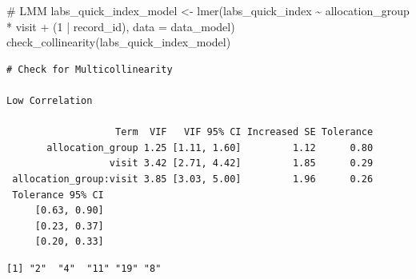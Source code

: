 \documentclass[
  letterpaper,
  DIV=11,
  numbers=noendperiod]{scrartcl}
\newenvironment{Shaded}{\begin{snugshade}}{\end{snugshade}}
\newcommand{\AttributeTok}[1]{\textcolor[rgb]{0.40,0.45,0.13}{#1}}
\newcommand{\CommentTok}[1]{\textcolor[rgb]{0.37,0.37,0.37}{#1}}
\newcommand{\DecValTok}[1]{\textcolor[rgb]{0.68,0.00,0.00}{#1}}
\newcommand{\FunctionTok}[1]{\textcolor[rgb]{0.28,0.35,0.67}{#1}}
\newcommand{\NormalTok}[1]{\textcolor[rgb]{0.00,0.23,0.31}{#1}}
\newcommand{\OtherTok}[1]{\textcolor[rgb]{0.00,0.23,0.31}{#1}}
\newcommand{\SpecialCharTok}[1]{\textcolor[rgb]{0.37,0.37,0.37}{#1}}
\newcommand{\StringTok}[1]{\textcolor[rgb]{0.13,0.47,0.30}{#1}}
\begin{document}
\begin{Shaded}
\begin{Highlighting}[]
\CommentTok{\# LMM}
\NormalTok{labs\_quick\_index\_model }\OtherTok{\textless{}{-}} \FunctionTok{lmer}\NormalTok{(labs\_quick\_index }\SpecialCharTok{\textasciitilde{}}\NormalTok{ allocation\_group }\SpecialCharTok{*}\NormalTok{ visit }\SpecialCharTok{+}\NormalTok{ (}\DecValTok{1} \SpecialCharTok{|}\NormalTok{ record\_id), }\AttributeTok{data =}\NormalTok{ data\_model)}
\FunctionTok{check\_collinearity}\NormalTok{(labs\_quick\_index\_model)}
\end{Highlighting}
\end{Shaded}

\begin{verbatim}
# Check for Multicollinearity

Low Correlation

                   Term  VIF   VIF 95% CI Increased SE Tolerance
       allocation_group 1.25 [1.11, 1.60]         1.12      0.80
                  visit 3.42 [2.71, 4.42]         1.85      0.29
 allocation_group:visit 3.85 [3.03, 5.00]         1.96      0.26
 Tolerance 95% CI
     [0.63, 0.90]
     [0.23, 0.37]
     [0.20, 0.33]
\end{verbatim}

\begin{Shaded}
\end{Shaded}

\begin{verbatim}
[1] "2"  "4"  "11" "19" "8" 
\end{verbatim}
\end{document}
